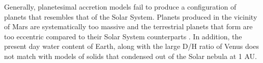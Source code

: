 
Generally, planetesimal accretion models fail to produce a configuration of planets that resembles that of the Solar System. 
Planets produced in the vicinity of Mars are systematically too massive \cite{wetherill92, raymond09, morishima10, izidoro15} 
and the terrestrial planets that form are too eccentric compared to their Solar System counterparts 
\cite{chambers98, agnor99, chambers01}. In addition, the present day water content of Earth, along with the large D/H ratio of 
Venus \cite{donahue82} does not match with models of solids that condensed out of the Solar nebula at 1 AU.


